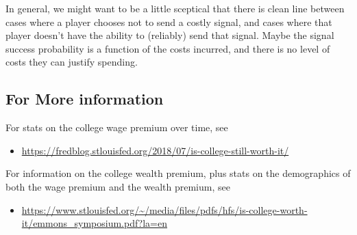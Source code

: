 \documentclass[
  11pt,
]{article}
\providecommand{\tightlist}{%
  \setlength{\itemsep}{0pt}\setlength{\parskip}{0pt}}
\begin{document}
In general, we might want to be a little sceptical that there is clean
line between cases where a player chooses not to send a costly signal,
and cases where that player doesn't have the ability to (reliably) send
that signal. Maybe the signal success probability is a function of the
costs incurred, and there is no level of costs they can justify
spending.

\hypertarget{for-more-information}{%
\subsection{For More information}\label{for-more-information}}

For stats on the college wage premium over time, see

\begin{itemize}
\tightlist
\item
  \url{https://fredblog.stlouisfed.org/2018/07/is-college-still-worth-it/}
\end{itemize}

For information on the college wealth premium, plus stats on the
demographics of both the wage premium and the wealth premium, see

\begin{itemize}
\tightlist
\item
  \url{https://www.stlouisfed.org/~/media/files/pdfs/hfs/is-college-worth-it/emmons_symposium.pdf?la=en}
\end{itemize}
\end{document}
